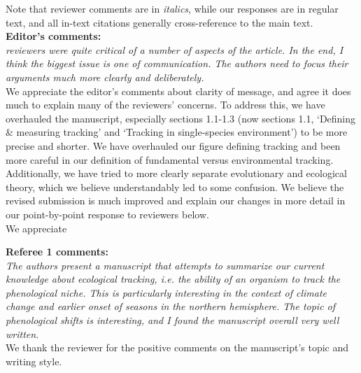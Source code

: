 \documentclass[11pt]{article}
\begin{document}
Note that reviewer comments are in \emph{italics}, while our responses are in regular text, and all in-text citations generally cross-reference to the main text.\\

{\bf Editor's comments:} \\

\emph{reviewers were quite critical of a number of aspects of the article.  In the end, I think the
biggest issue is one of communication. The authors need to focus their arguments much more
clearly and deliberately.}\\

We appreciate the editor's comments about clarity of message, and agree it does much to explain many of the reviewers' concerns. To address this, we have overhauled the manuscript, especially sections 1.1-1.3 (now sections 1.1, `Defining \& measuring tracking' and `Tracking in single-species environment') to be more precise and shorter. We have overhauled our figure defining tracking and been more careful in our definition of fundamental versus environmental tracking. Additionally, we have tried to more clearly separate evolutionary and ecological theory, which we believe understandably led to some confusion. We believe the revised submission is much improved and explain our changes in more detail in our point-by-point response to reviewers below.\\

We appreciate 

{\bf Referee 1 comments:} \\

\emph{The authors present a manuscript that attempts to summarize our current knowledge about
ecological tracking, i.e. the ability of an organism to track the phenological niche. This is
particularly interesting in the context of climate change and earlier onset of seasons in the
northern hemisphere. The topic of phenological shifts is interesting, and I found the
manuscript overall very well written.}\\

We thank the reviewer for the positive comments on the manuscript's topic and writing style. \\
\end{document}
